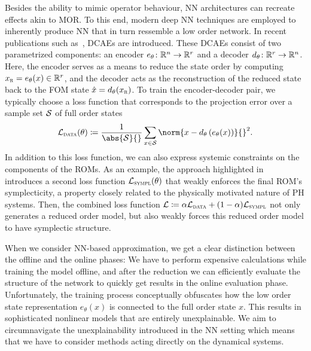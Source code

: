 Besides the ability to mimic operator behaviour, \ac{NN} architectures can recreate effects akin to \ac{MOR}.
To this end, modern deep \ac{NN} techniques are employed to inherently produce \ac{NN} that in turn ressemble a low order network.
In recent publications such as~\cite{Lee2020, Salvador2021, Benner2022, Kim2022, Buchfink2023}, \acp{DCAE} are introduced.
These \acp{DCAE} consist of two parametrized components: an encoder $e_\theta \colon \mathbb{R}^n \to \mathbb{R}^r$ and a decoder $d_\theta \colon \mathbb{R}^r \to \mathbb{R}^n$.
Here, the encoder serves as a means to reduce the state order by computing $x_{\textnormal{\scshape r}} = e_\theta(x) \in \mathbb{R}^r$, and the decoder acts as the reconstruction of the reduced state back to the \ac{FOM} state $\hat{x} = d_\theta(x_{\textnormal{\scshape r}})$.
To train the encoder-decoder pair, we typically choose a loss function that corresponds to the projection error over a sample set $\mathcal{S}$ of full order states
\begin{equation}\label{eq:reduction-loss}
    \mcl{L}_{\msc{data}}(\theta) \coloneqq \frac{1}{\abs{\mcl{S}}{}} \sum\limits_{x \in \mcl{S}} \norm{x - d_\theta\left( e_\theta(x) \right)}{}^2.
\end{equation}
In addition to this loss function, we can also express systemic constraints on the components of the \acp{ROM}.
As an example, the approach highlighted in~\cite{Buchfink2023} introduces a second loss function $\mathcal{L}_{\textnormal{\scshape sympl}}(\theta)$ that weakly enforces the final \ac{ROM}'s symplecticity, a property closely related to the physically motivated nature of \ac{PH} systems.
Then, the combined loss function $\mathcal{L} \coloneqq \alpha \mathcal{L}_{\textnormal{\scshape data}} + (1 - \alpha) \mathcal{L}_{\textnormal{\scshape sympl}}$ not only generates a reduced order model, but also weakly forces this reduced order model to have symplectic structure.

When we consider \ac{NN}-based approximation, we get a clear distinction between the offline and the online phases: We have to perform expensive calculations while training the model offline, and after the reduction we can efficiently evaluate the structure of the network to quickly get results in the online evaluation phase.
Unfortunately, the training process conceptually obfuscates how the low order state representation $e_\theta(x)$ is connected to the full order state $x$.
This results in sophisticated nonlinear models that are entirely unexplainable.
We aim to circumnavigate the unexplainability introduced in the \ac{NN} setting which means that we have to consider methods acting directly on the dynamical systems.
